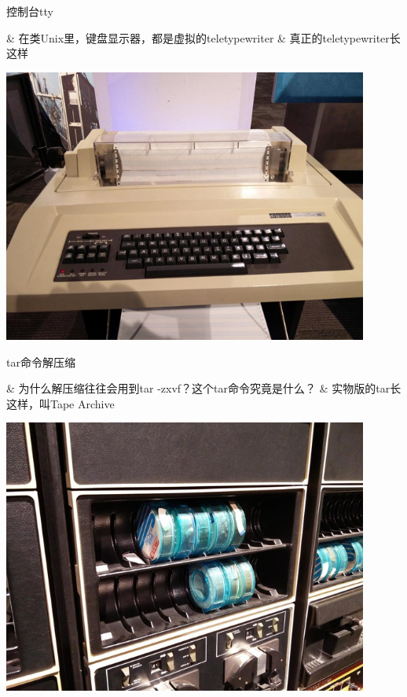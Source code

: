 \begin{frame}[fragile]{控制台tty}
  \begin{easylist}
    & 在类Unix里，键盘显示器，都是虚拟的teletypewriter
    & 真正的teletypewriter长这样
  \end{easylist}
  \includegraphics[width=0.9\textwidth]{figure/intro-tty.jpg}
\end{frame}

\begin{frame}[fragile]{tar命令解压缩}
  \begin{easylist}
    & 为什么解压缩往往会用到tar -zxvf？这个tar命令究竟是什么？
    & 实物版的tar长这样，叫Tape Archive
  \end{easylist}
  \includegraphics[width=0.9\textwidth]{figure/intro-tar.jpg}
\end{frame}

